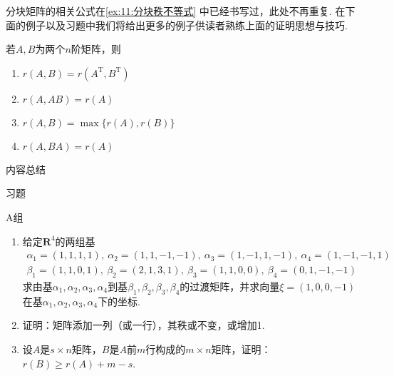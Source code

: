 分块矩阵的相关公式在\autoref{ex:11:分块秩不等式} 中已经书写过，此处不再重复. 在下面的例子以及习题中我们将给出更多的例子供读者熟练上面的证明思想与技巧.
\begin{example}
    若$A,B$为两个$n$阶矩阵，则
    \begin{enumerate}[label=\Alph*.]
        \item $r(A,B)=r(A^\mathrm{T},B^\mathrm{T})$

        \item $r(A,AB)=r(A)$

        \item $r(A,B)=\max\{r(A), r(B)\}$

        \item $r(A,BA)=r(A)$
    \end{enumerate}
\end{example}

\begin{solution}

\end{solution}

\vspace{2ex}
\centerline{\heiti \Large 内容总结}

\vspace{2ex}
\centerline{\heiti \Large 习题}

\vspace{2ex}
{\kaishu }
\begin{flushright}
    \kaishu

\end{flushright}

\centerline{\heiti A组}
\begin{enumerate}
    \item 给定$\mathbf{R}^4$的两组基
          \begin{gather*}
              \alpha_1=(1,1,1,1),\ \alpha_2=(1,1,-1,-1),\ \alpha_3=(1,-1,1,-1),\ \alpha_4=(1,-1,-1,1) \\
              \beta_1=(1,1,0,1),\ \beta_2=(2,1,3,1),\ \beta_3=(1,1,0,0),\ \beta_4=(0,1,-1,-1)
          \end{gather*}
          求由基$\alpha_1,\alpha_2,\alpha_3,\alpha_4$到基$\beta_1,\beta_2,\beta_3,\beta_4$的过渡矩阵，并求向量$\xi=(1,0,0,-1)$在基$\alpha_1,\alpha_2,\alpha_3,\alpha_4$下的坐标.

    \item 证明：矩阵添加一列（或一行），其秩或不变，或增加1.

    \item 设$A$是$s \times n$矩阵，$B$是$A$前$m$行构成的$m \times n$矩阵，证明：$r(B) \geqslant r(A) + m - s$.
\end{enumerate}


